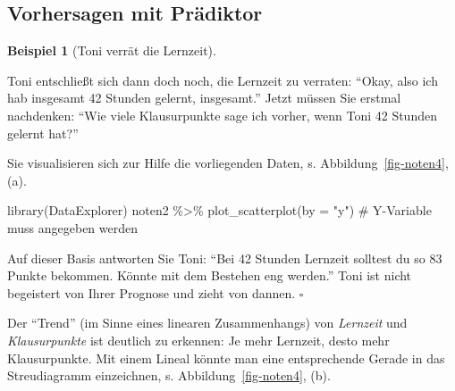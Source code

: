 \documentclass[
  letterpaper,
  twoside,
  open=any]{scrbook}
\newenvironment{Shaded}{\begin{snugshade}}{\end{snugshade}}
\newcommand{\AttributeTok}[1]{\textcolor[rgb]{0.40,0.45,0.13}{#1}}
\newcommand{\CommentTok}[1]{\textcolor[rgb]{0.37,0.37,0.37}{#1}}
\newcommand{\FunctionTok}[1]{\textcolor[rgb]{0.28,0.35,0.67}{#1}}
\newcommand{\NormalTok}[1]{\textcolor[rgb]{0.00,0.23,0.31}{#1}}
\newcommand{\SpecialCharTok}[1]{\textcolor[rgb]{0.37,0.37,0.37}{#1}}
\newcommand{\StringTok}[1]{\textcolor[rgb]{0.13,0.47,0.30}{#1}}
\theoremstyle{definition}
\theoremstyle{definition}
\theoremstyle{definition}
\newtheorem{example}{Beispiel}[chapter]
\theoremstyle{remark}
\begin{document}
\subsection{Vorhersagen mit
Prädiktor}\label{vorhersagen-mit-pruxe4diktor}

\begin{example}[Toni verrät die
Lernzeit]\protect\hypertarget{exm-noten3}{}\label{exm-noten3}

Toni entschließt sich dann doch noch, die Lernzeit zu verraten:
\enquote{Okay, also ich hab insgesamt 42 Stunden gelernt, insgesamt.}
Jetzt müssen Sie erstmal nachdenken: \enquote{Wie viele Klausurpunkte
sage ich vorher, wenn Toni 42 Stunden gelernt hat?}

Sie visualisieren sich zur Hilfe die vorliegenden Daten, s.
Abbildung~\ref{fig-noten4}, (a).

\begin{Shaded}
\begin{Highlighting}[]
\FunctionTok{library}\NormalTok{(DataExplorer)}
\NormalTok{noten2 }\SpecialCharTok{\%\textgreater{}\%} 
  \FunctionTok{plot\_scatterplot}\NormalTok{(}\AttributeTok{by =} \StringTok{"y"}\NormalTok{)  }\CommentTok{\# Y{-}Variable muss angegeben werden}
\end{Highlighting}
\end{Shaded}

Auf dieser Basis antworten Sie Toni: \enquote{Bei 42 Stunden Lernzeit
solltest du so 83 Punkte bekommen. Könnte mit dem Bestehen eng werden.}
Toni ist nicht begeistert von Ihrer Prognose und zieht von dannen.
\(\square\)

\end{example}

Der \enquote{Trend} (im Sinne eines linearen Zusammenhangs) von
\emph{Lernzeit} und \emph{Klausurpunkte} ist deutlich zu erkennen: Je
mehr Lernzeit, desto mehr Klausurpunkte. Mit einem Lineal könnte man
eine entsprechende Gerade in das Streudiagramm einzeichnen, s.
Abbildung~\ref{fig-noten4}, (b).
\end{document}

